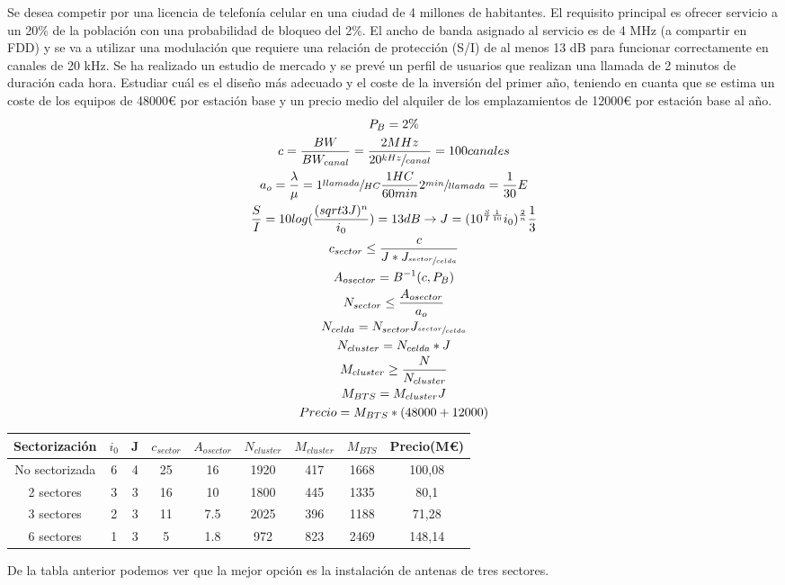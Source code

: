 \begin{exercise}[3]
	Se desea competir por una licencia de telefonía celular en una ciudad de 4 millones de habitantes. El requisito principal es ofrecer servicio a un 20\% de la población con una probabilidad de bloqueo del 2\%. El ancho de banda asignado al servicio es de 4 MHz (a compartir en FDD) y se va a utilizar una modulación que requiere una relación de protección (S/I) de al menos 13 dB para funcionar correctamente en canales de 20 kHz. Se ha realizado un estudio de mercado y se prevé un perfil de usuarios que realizan una llamada de 2 minutos de duración cada hora. Estudiar cuál es el diseño más adecuado y el coste de la inversión del primer año, teniendo en cuanta que se estima un coste de los equipos de 48000€ por estación base y un precio medio del alquiler de los emplazamientos de 12000€ por estación base al año.\\
	\begin{gather*}
		P_B=2\%\\
		c=\frac{BW}{BW_{canal}}=\frac{2MHz}{20\sfrac{kHz}{canal}}=100canales\\
		a_o=\frac{\lambda}{\mu}=1\sfrac{llamada}{HC}\frac{1HC}{60min}2\sfrac{min}{llamada}=\frac{1}{30}E\\
		\frac{S}{I}=10log(\frac{(sqrt{3J})^n}{i_0})=13dB\to J=(10^{\frac{S}{I}\frac{1}{10}}i_0)^{\frac{2}{n}}\frac{1}{3}\\
		c_{sector}\leq\frac{c}{J*J_{\sfrac{sector}{celda}}}\\
		A_{osector}=B^{-1}(c,P_B)\\
		N_{sector}\leq\frac{A_{osector}}{a_o}\\
		N_{celda}=N_{sector}J_{\sfrac{sector}{celda}}\\
		N_{cluster}=N_{celda}*J\\
		M_{cluster}\geq\frac{N}{N_{cluster}}\\
		M_{BTS}=M_{cluster}J\\
		Precio=M_{BTS}*(48000+12000)
	\end{gather*}
	\begin{tabular}{c|c|c|c|c|c|c|c|c}
		Sectorización  	& $i_0$	& J & $c_{sector}$  & $A_{osector}$ & $N_{cluster}$ & $M_{cluster}$ 	& $M_{BTS}$ & Precio(M€) 	\\\hline
		No sectorizada 	& 6	& 4 & 25	& 16	& 1920	& 417 & 1668 & 100,08	\\\hline
		2 sectores		& 3	& 3 & 16	& 10	& 1800	& 445 & 1335 & 80,1		\\\hline
		3 sectores		& 2	& 3 & 11	& 7.5	& 2025	& 396 & 1188 & 71,28	\\\hline
		6 sectores		& 1	& 3 & 5		& 1.8	& 972	& 823 & 2469 & 148,14	\\\hline
	\end{tabular}
	De la tabla anterior podemos ver que la mejor opción es la instalación de antenas de tres sectores.
\end{exercise}
